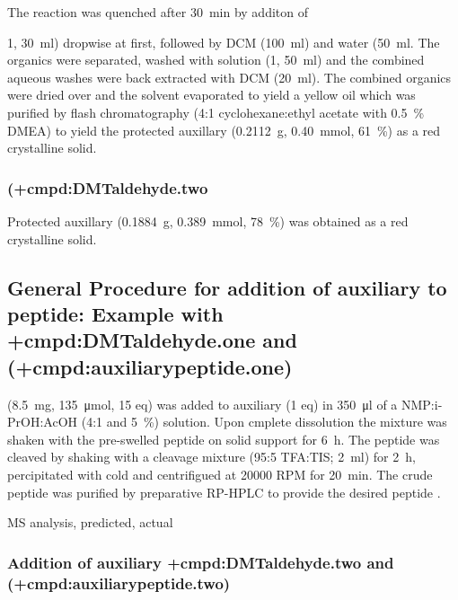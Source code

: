 {The reaction was quenched after \SI{30}{\minute} by additon of  {\SI{1}{\Molar}, \SI{30}{\milli\litre}) dropwise at first, followed by DCM (\SI{100}{\milli\litre}) and water (\SI{50}{\milli\litre}. The organics were separated, washed with  solution (\SI{1}{\Molar}, \SI{50}{\milli\litre}) and the combined aqueous washes were back extracted with DCM (\SI{20}{\milli\litre}). The combined organics were dried over  and the solvent evaporated \invacuo to yield a yellow oil which was purified by flash chromatography (4:1 cyclohexane:ethyl acetate with \SI{0.5}{\percent} DMEA) to yield the protected auxillary  (\SI{0.2112}{\gram}, \SI{0.40}{\milli\mol}, \SI{61}{\percent}) as a red crystalline solid.

    \subsubsection{ (\cmpd+{cmpd:DMTaldehyde.two}}
    Protected auxillary  (\SI{0.1884}{\gram}, \SI{0.389}{\milli\mol}, \SI{78}{\percent}) was obtained as a red crystalline solid.


\subsection{General Procedure for addition of auxiliary to peptide: Example with \cmpd+{cmpd:DMTaldehyde.one} and  (\cmpd+{cmpd:auxiliarypeptide.one})}

 (\SI{8.5}{\milli\gram}, \SI{135}{\micro\mole}, 15 eq) was added to auxiliary  (1 eq) in \SI{350}{\micro\litre} of a NMP:i-PrOH:AcOH (4:1 and \SI{5}{\percent}) solution. Upon cmplete dissolution the mixture was shaken with the pre-swelled peptide on solid support for \SI{6}{\hour}. The peptide was cleaved by shaking with a cleavage mixture (95:5 TFA:TIS; \SI{2}{\milli\litre}) for \SI{2}{\hour}, percipitated with cold  and centrifigued at 20000 RPM for \SI{20}{\minute}. The crude peptide was purified by preparative RP-HPLC to provide the desired peptide .

MS analysis, predicted, actual

    \subsubsection{Addition of auxiliary \cmpd+{cmpd:DMTaldehyde.two} and  (\cmpd+{cmpd:auxiliarypeptide.two})}}

}
